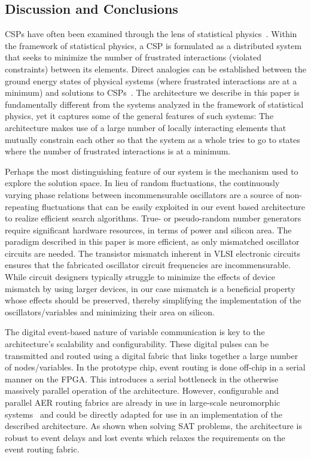\documentclass[10pt]{article}
\begin{document}
\subsection*{Discussion and Conclusions}
\label{sec:discussion}

CSPs have often been examined through the lens of statistical physics~\cite{mezard_etal02,krzakala_kurchan07}. Within the framework of statistical physics, a CSP is formulated as a distributed system that seeks to minimize the number of frustrated interactions (violated constraints) between its elements. Direct analogies can be established between the ground energy states of physical systems (where frustrated interactions are at a minimum) and solutions to CSPs~\cite{Barahona82}. The architecture we describe in this paper is fundamentally different from the systems analyzed in the framework of statistical physics, yet it captures some of the general features of such systems: The architecture makes use of a large number of locally interacting elements that mutually constrain each other so that the system as a whole tries to go to states where the number of frustrated interactions is at a minimum. 

Perhaps the most distinguishing feature of our system is the mechanism used to explore the solution space. In lieu of random fluctuations, the continuously varying phase relations between incommensurable oscillators are a source of non-repeating fluctuations that can be easily exploited in our event based architecture to realize efficient search algorithms.  True- or pseudo-random number generators require significant hardware resources, in terms of power and silicon area. The paradigm described in this paper is more efficient, as only  mismatched oscillator circuits are needed. The transistor mismatch inherent in VLSI electronic circuits ensures that the fabricated oscillator circuit frequencies are incommensurable. While circuit designers typically struggle to minimize the effects of device mismatch by using larger devices, in our case mismatch is a beneficial property whose effects should be preserved, thereby simplifying the implementation of the oscillators/variables and minimizing their area on silicon.

The digital event-based nature of variable communication is key to the architecture's scalability and configurability. These digital pulses can be transmitted and routed using a digital fabric that links together a large number of nodes/variables. In the prototype chip, event routing is done off-chip in a serial manner on the FPGA. This introduces a serial bottleneck in the otherwise massively parallel operation of the architecture. However, configurable and parallel AER routing fabrics are already in use in large-scale neuromorphic systems~\cite{Joshi_etal10,Merolla_etal14} and could be directly adapted for use in an implementation of the described architecture. As shown when solving SAT problems, the architecture is robust to event delays and lost events which relaxes the requirements on the event routing fabric. 
\end{document}
